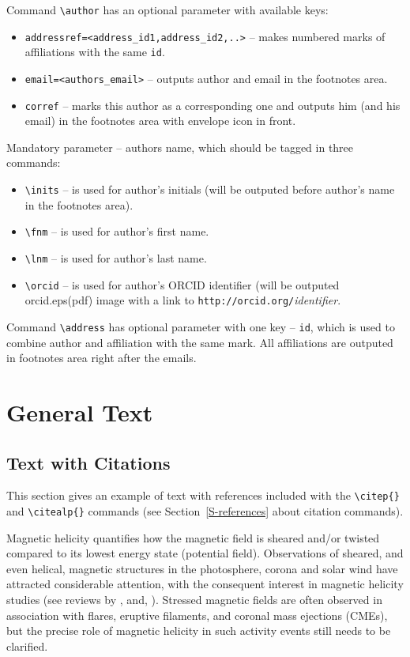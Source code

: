 \documentclass[namedreferences]{solarphysics}
\begin{document}
\begin{article}
Command \verb+\author+  has an optional parameter with available keys: 
\begin{itemize}
\item \verb+addressref=<address_id1,address_id2,..>+ -- makes numbered marks of affiliations with the same \texttt{id}.
\item \verb+email=<authors_email>+ -- outputs author and email in the footnotes area.
\item \verb+corref+ -- marks this author as a corresponding one and outputs him (and his email) in the footnotes area with envelope icon in front. 
\end{itemize}
Mandatory parameter -- authors name, which should be tagged in three commands:
\begin{itemize}
\item \verb+\inits+ -- is used for author's initials (will be outputed before author's name in the footnotes area).
\item \verb+\fnm+ -- is used for author's first name.
\item \verb+\lnm+ -- is used for author's last name.
\item \verb+\orcid+ -- is used for author's ORCID identifier (will be outputed orcid.eps(pdf) image with a link to \verb+http://orcid.org/+\textit{identifier}.
\end{itemize}

Command \verb+\address+ has optional parameter  with one key -- \texttt{id}, which is used to combine author and affiliation with the same mark.
All affiliations are outputed in footnotes area right after the emails.
 
\section{General Text} %
      \label{S-general}      

\subsection{Text with Citations} %
  \label{S-text}
This section gives an example of text with references 
included with the \verb+\citep{}+ and \verb+\citealp{}+ commands
(see Section~\ref{S-references} about citation commands).

Magnetic helicity quantifies how the magnetic field is sheared
and/or twisted compared to its lowest energy state (potential
field). Observations of sheared, and even helical, magnetic
structures in the photosphere, corona and solar wind have
attracted considerable attention, with the consequent interest in
magnetic helicity studies (see reviews by \citealp{Brown99}, and,
\citealp{Berger03}). Stressed magnetic fields are often observed
in association with flares, eruptive filaments, and coronal mass
ejections (CMEs), but the precise role of magnetic helicity in
such activity events still needs to be clarified.


\end{article}
\end{document}
